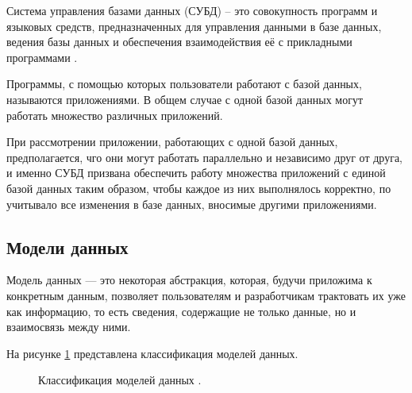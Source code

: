 \documentclass[a4paper,14pt]{article}
\begin{document}
Система управления базами данных (СУБД) -- это совокупность программ и языковых средств, предназначенных для управления данными в базе данных, ведения базы данных и обеспечения взаимодействия её с прикладными программами \cite{karpova02}.

Программы, с помощью которых пользователи работают с базой данных, называются приложениями. В общем случае с одной базой данных могут работать множество различных приложений.

При рассмотрении приложении, работающих с одной базой данных, предполагается, чго они могут работать параллельно и независимо друг от друга, и именно СУБД призвана обеспечить работу множества приложений с единой базой данных таким образом, чтобы каждое из них выполнялось корректно, по учитывало все изменения в
базе данных, вносимые другими приложениями.

\subsection{Модели данных}

Модель данных — это некоторая абстракция, которая, будучи приложима к конкретным данным, позволяет пользователям и разработчикам трактовать их уже как информацию, то есть сведения, содержащие не только данные, но и взаимосвязь между ними.

На рисунке \ref{fig:data_models} представлена классификация моделей данных.

\begin{figure}[!h]
	\caption{Классификация моделей данных \cite{karpova02}.}
	\label{fig:data_models}
\end{figure}
\end{document}
